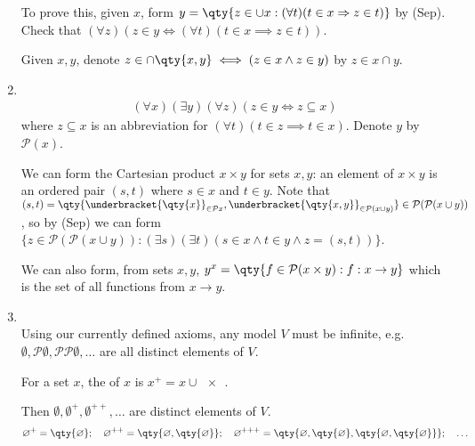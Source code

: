 \begin{enumerate}
\begin{remark}
        To prove this, given $x$, form $y = \qty{z \in \cup x : (\forall t)(t \in x \implies z \in t)}$ by (Sep).
        Check that $(\forall z)(z \in y \iff (\forall t)(t \in x \implies z \in t))$.

        Given $x, y$, denote $z \in \cap \qty{x, y} \iff (z \in x \wedge z \in y)$ by $z \in x \cap y$.
    \end{remark}

    \item {} \\
    \begin{align*}
        (\forall x)(\exists y)(\forall z)(z \in y \Leftrightarrow z \subseteq x)
    \end{align*}
    where $z \subseteq x$ is an abbreviation for $(\forall t)(t \in z \implies t \in x)$.
    Denote $y$ by $\mathcal{P}(x)$.

    We can form the Cartesian product $x \times y$ for sets $x, y$: an element of $x \times y$ is an ordered pair $(s, t)$ where $s \in x$ and $t \in y$.
    Note that $(s, t) = \qty{\underbracket{\qty{x}}_{\in \mathcal{P}x}, \underbracket{\qty{x, y}}_{\in \mathcal{P}(x \cup y)}} \in \mathcal{P}(\mathcal{P}(x \cup y))$, so by (Sep) we can form $\{z \in \mathcal P(\mathcal P(x \cup y)) : (\exists s)(\exists t) (s \in x \wedge t \in y \wedge z = (s, t))\}$.

    We can also form, from sets $x, y$, $y^x = \qty{f \in \mathcal{P}(x \times y) : f : x \to y}$ which is the set of all functions from $x \to y$.

    \item {} \\
    Using our currently defined axioms, any model $V$ must be infinite, e.g. $\emptyset, \mathcal{P}\emptyset, \mathcal{P}\mathcal{P} \emptyset, \dots$ are all distinct elements of $V$.

    \begin{definition}[Successor]
        For a set $x$, the  of $x$ is $x^+ = x \cup \qty{x}$.
    \end{definition}
    \begin{example}
        Then $\emptyset, \emptyset^+, \emptyset^{++}, \dots$ are distinct elements of $V$.
        \begin{align*}
            \varnothing^+ = \qty{\varnothing};\quad \varnothing^{++} = \qty{\varnothing, \qty{\varnothing}};\quad \varnothing^{+++} = \qty{\varnothing, \qty{\varnothing}, \qty{\varnothing, \qty{\varnothing}}};\quad \dots
        \end{align*}
    \end{example}


\end{enumerate}

